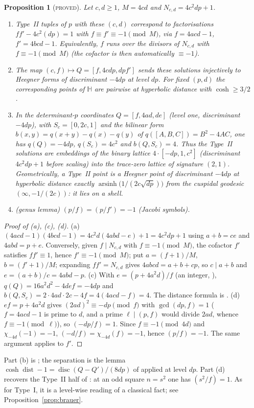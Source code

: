\documentclass[10pt,reqno]{amsart}
\newtheorem{proposition}[theorem]{Proposition}
\theoremstyle{definition}
\numberwithin{equation}{section}
\newcommand{\HH}{\mathbb H}
\newcommand{\status}[1]{\textup{\textsc{#1}}}
\begin{document}
\begin{proposition}[\status{proved}]\label{prop:typeII}
Let $c,d\ge1$, $M=4cd$ and $N_{c,d}=4c^2dp+1$.
\begin{enumerate}
\item[(a)] Type~II tuples of $p$ with these $(c,d)$ correspond to
factorisations $ff'-4c^2(dp)=1$ with $f\equiv f'\equiv-1\pmod{M}$, via
$f=4acd-1$, $f'=4bcd-1$. Equivalently, $f$ runs over the divisors of
$N_{c,d}$ with $f\equiv-1\pmod M$ (the cofactor is then automatically
$\equiv-1$).
\item[(b)] The map $(c,f)\mapsto Q=[f,4cdp,dpf']$ sends these solutions
injectively to Heegner forms of discriminant $-4dp$ at level $dp$. For
fixed $(p,d)$ the corresponding points of $\HH$ are pairwise at hyperbolic
distance with $\cosh\ge3/2$.
\item[(c)] In the determinant-$p$ coordinates $Q=[f,4ad,de]$ (level one,
discriminant $-4dp$), with $S_c=[0,2c,1]$ and the bilinear form
$b(x,y)=q(x+y)-q(x)-q(y)$ of $q([A,B,C])=B^2-4AC$, one has
$q(Q)=-4dp$, $q(S_c)=4c^2$ and $b(Q,S_c)=4$. Thus the Type~II solutions
are embeddings of the binary lattice $4\cdot[-dp,1,c^2]$ (discriminant
$4c^2dp+1$ before scaling) into the trace-zero lattice of signature $(2,1)$.
Geometrically, a Type~II point is a Heegner point of discriminant $-4dp$ at
hyperbolic distance exactly $\operatorname{arsinh}\bigl(1/(2c\sqrt{dp})\bigr)$
from the cuspidal geodesic $(\infty,-1/(2c))$: it lies on a \emph{shell}.
\item[(d)] (genus lemma) $(p/f)=(p/f')=-1$ (Jacobi symbols).
\end{enumerate}
\end{proposition}
\begin{proof}[Proof of (a), (c), (d)]
(a) $(4acd-1)(4bcd-1)=4c^2d(4abd-e)+1=4c^2dp+1$ using $a+b=ce$ and
$4abd=p+e$. Conversely, given $f\mid N_{c,d}$ with $f\equiv-1\pmod M$, the
cofactor $f'$ satisfies $ff'\equiv1$, hence $f'\equiv-1\pmod M$; put
$a=(f+1)/M$, $b=(f'+1)/M$; expanding $ff'=N_{c,d}$ gives
$4abcd=a+b+cp$, so $c\mid a+b$ and $e=(a+b)/c=4abd-p$.
(c) With $e=(p+4a^2d)/f$ (an integer, \cite[(2.19)]{ET}),
$q(Q)=16a^2d^2-4def=-4dp$ and
$b(Q,S_c)=2\cdot4ad\cdot2c-4f=4(4acd-f)=4$. The distance formula is
\cite[Prop.~2.5]{O128}.
(d) $ef=p+4a^2d$ gives $(2ad)^2\equiv-dp\pmod f$ with $\gcd(dp,f)=1$
($f=4acd-1$ is prime to $d$, and a prime $\ell\mid(p,f)$ would divide
$2ad$, whence $f\equiv-1\pmod\ell$), so
$(-dp/f)=1$. Since $f\equiv-1\pmod{4d}$ and $\chi_{-4d}(-1)=-1$,
$(-d/f)=\chi_{-4d}(f)=-1$, hence $(p/f)=-1$. The same argument applies to
$f'$.
\end{proof}
Part (b) is \cite[Prop.~2.1, Lemma~2.2]{O128}; the separation is the
lemma $\cosh\operatorname{dist}-1=\operatorname{disc}(Q-Q')/(8dp)$ of
\cite[Lemma~2.2]{TH} applied at level $dp$. Part (d) recovers the Type~II
half of \cite[Prop.~1.6]{ET}: at an odd square $n=s^2$ one has
$(s^2/f)=1$. As for Type~I, it is a level-wise reading of a classical
fact; see Proposition~\ref{prop:brauer}.
\end{document}
